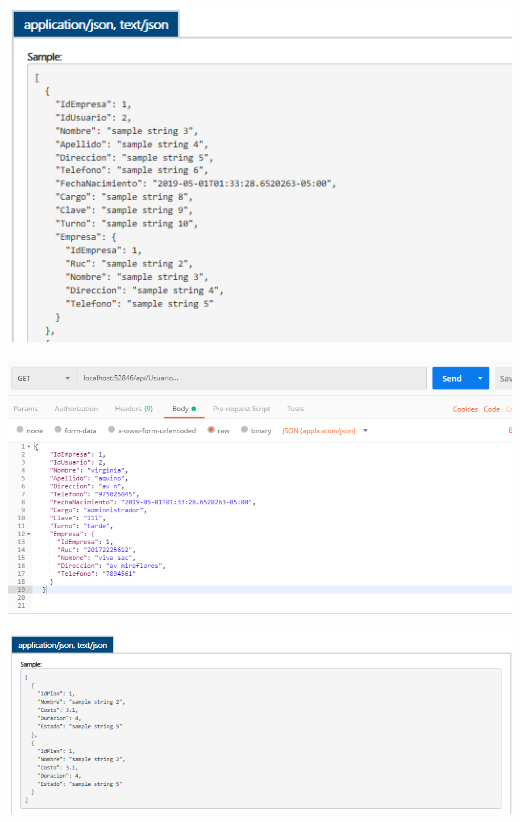 \begin{center}
			\includegraphics[width=15cm]{./Imagenes/6}
             \end{center}
        \begin{center}
			\includegraphics[width=15cm]{./Imagenes/7}
             \end{center}
\begin{center}
			\includegraphics[width=15cm]{./Imagenes/8}
             \end{center}
        
        
        

